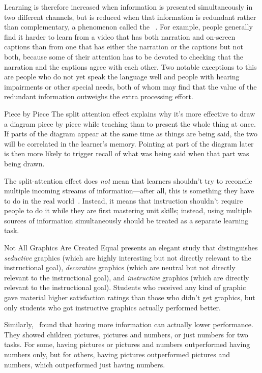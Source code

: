 Learning is therefore increased when information is presented simultaneously in two different channels,
but is reduced when that information is redundant rather than complementary,
a phenomenon called the ~\cite{Maye2003}.
For example,
people generally find it harder to learn from a video that has both narration and on-screen captions
than from one that has either the narration or the captions but not both,
because some of their attention has to be devoted to checking
that the narration and the captions agree with each other.
Two notable exceptions to this are people who do not yet speak the language well
and people with hearing impairments or other special needs,
both of whom may find that the value of the redundant information
outweighs the extra processing effort.

\begin{aside}{Piece by Piece}
  The split attention effect explains why
  it's more effective to draw a diagram piece by piece while teaching
  than to present the whole thing at once.
  If parts of the diagram appear at the same time as things are being said,
  the two will be correlated in the learner's memory.
  Pointing at part of the diagram later
  is then more likely to trigger recall of what was being said when that part was being drawn.
\end{aside}

The split-attention effect does \emph{not} mean
that learners shouldn't try to reconcile multiple incoming streams of information---after all,
this is something they have to do in the real world~\cite{Atki2000}.
Instead,
it means that instruction shouldn't require people to do it
while they are first mastering unit skills;
instead,
using multiple sources of information simultaneously should be treated as a separate learning task.

\begin{aside}{Not All Graphics Are Created Equal}
  \cite{Sung2012} presents an elegant study that distinguishes \emph{seductive} graphics
  (which are highly interesting but not directly relevant to the instructional goal),
  \emph{decorative} graphics
  (which are neutral but not directly relevant to the instructional goal),
  and \emph{instructive} graphics
  (which are directly relevant to the instructional goal).
  Students who received any kind of graphic gave material higher satisfaction ratings
  than those who didn't get graphics,
  but only students who got instructive graphics actually performed better.

  Similarly,~\cite{Stam2013,Stam2014} found that
  having more information can actually lower performance.
  They showed children pictures, pictures and numbers, or just numbers for two tasks.
  For some,
  having pictures or pictures and numbers outperformed having numbers only,
  but for others,
  having pictures outperformed pictures and numbers,
  which outperformed just having numbers.
\end{aside}

